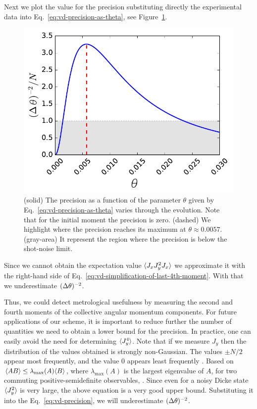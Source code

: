 Next we plot the value for the precision substituting directly the experimental data into Eq.~\eqref{eq:vd-precision-as-theta}, see Figure~\ref{fig:vd-precision-theta-experiment}.
\begin{figure}[htp]
  \centering
  \includegraphics[scale=.65]{img/plots/VD_precision_theta.pdf}
  \caption[Evolution of the precision for $\theta$.]{(solid) The precision as a function of the parameter $\theta$ given by Eq.~\eqref{eq:vd-precision-as-theta} varies through the evolution.
  Note that for the initial moment the precision is zero.
  (dashed) We highlight where the precision reaches its maximum at $\theta \approx 0.0057$.
  (gray-area) It represent the region where the precision is below the shot-noise limit.}
  \label{fig:vd-precision-theta-experiment}
\end{figure}
Since we cannot obtain the expectation value $\langle J_xJ_y^2J_x \rangle$ we approximate it with the right-hand side of Eq.~\eqref{eq:vd-simplification-of-last-4th-moment}.
With that we underestimate $(\Delta \theta )^{-2}$.

Thus, we could detect metrological usefulness by measuring the second and fourth moments of the collective angular momentum components.
For future applications of our scheme, it is important to reduce further the number of quantities we need to obtain a lower bound for the precision.
In practice, one can easily avoid the need for determining $\langle J_y^4 \rangle$.
Note that if we measure $J_y$ then the distribution of the values obtained is strongly non-Gaussian.
The values $\pm N/2$ appear most frequently, and the value 0 appears least frequently \cite{VD48}.
Based on $\langle AB \rangle\leq\lambda_{\max}(A)\langle B \rangle$, where $\lambda_{\max}(A)$ is the largest eigenvalue of $A$, for two commuting positive-semidefinite observables,
\be
  \leq{}.
\ee
Since even for a noisy Dicke state $\langle J_y^2 \rangle$ is very large, the above equation is a very good upper bound.
Substituting it into the Eq.~\eqref{eq:vd-precision}, we will underestimate $(\Delta \theta )^{-2}$.

